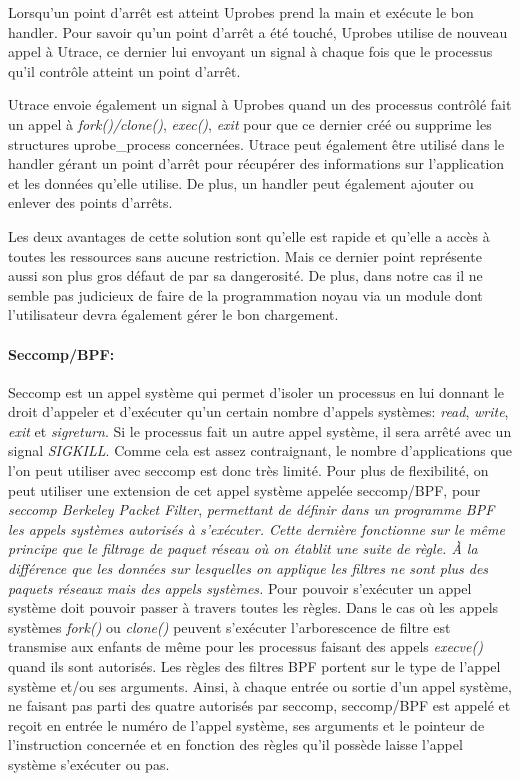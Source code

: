 Lorsqu'un point d'arrêt est atteint Uprobes prend la main et exécute le bon
handler. Pour savoir qu'un point d'arrêt a été touché, Uprobes utilise de
nouveau appel à Utrace, ce dernier lui envoyant un signal à chaque fois que le
processus qu'il contrôle atteint un point d'arrêt.

Utrace envoie également un signal à Uprobes quand un des processus contrôlé fait
un appel à \textit{fork()/clone()}, \textit{exec()}, \textit{exit} pour que ce
dernier créé ou supprime les structures uprobe\_process concernées. Utrace peut
également être utilisé dans le handler gérant un point d'arrêt pour récupérer
des informations sur l'application et les données qu'elle utilise. De plus, un
handler peut également ajouter ou enlever des points d'arrêts.

Les deux avantages de cette solution sont qu'elle est rapide et qu'elle a accès
à toutes les ressources sans aucune restriction. Mais ce dernier point
représente aussi son plus gros défaut de par sa dangerosité. De plus, dans notre
cas il ne semble pas judicieux de faire de la programmation noyau via un module
dont l'utilisateur devra également gérer le bon chargement.

\paragraph{Seccomp/BPF:}

Seccomp \citet{INTERCEPTION:seccomp_bpf} est un appel système qui permet d'isoler
un processus en lui donnant le droit d'appeler et d'exécuter qu'un certain
nombre d'appels systèmes: \textit{read}, \textit{write}, \textit{exit} et
\textit{sigreturn}. Si le processus fait un autre appel système, il sera arrêté
avec un signal \textit{SIGKILL}. Comme cela est assez contraignant, le nombre
d'applications que l'on peut utiliser avec seccomp est donc très limité. Pour
plus de flexibilité, on peut utiliser une extension de cet appel système appelée
seccomp/BPF, pour \textit{seccomp Berkeley Packet Filter}, \textit{permettant de définir
dans un programme BPF \citet{INTERCEPTION:bpf} les appels systèmes autorisés à
s'exécuter. Cette dernière fonctionne sur le même principe que le filtrage de
paquet réseau où on établit une suite de règle. À la différence que les données
sur lesquelles on applique les filtres ne sont plus des paquets réseaux mais des
appels systèmes.} Pour pouvoir s'exécuter un appel système doit pouvoir passer à
travers toutes les règles. Dans le cas où les appels systèmes \textit{fork()} ou
\textit{clone()} peuvent s'exécuter l'arborescence de filtre est transmise aux
enfants de même pour les processus faisant des appels \textit{execve()} quand
ils sont autorisés. Les règles des filtres BPF portent sur le type de l'appel
système et/ou ses arguments. Ainsi, à chaque entrée ou sortie d'un appel
système, ne faisant pas parti des quatre autorisés par seccomp, seccomp/BPF est
appelé et reçoit en entrée le numéro de l'appel système, ses arguments et le
pointeur de l'instruction concernée et en fonction des règles qu'il possède
laisse l'appel système s'exécuter ou pas.

